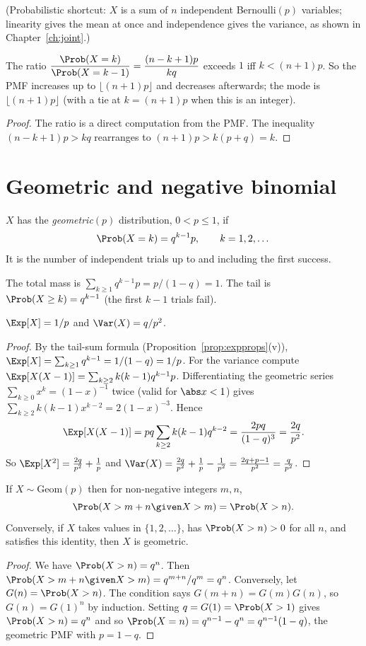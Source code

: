 (Probabilistic shortcut: $X$ is a sum of $n$ independent Bernoulli$(p)$ variables;
linearity gives the mean at once and independence gives the variance, as shown in
Chapter~\ref{ch:joint}.)

\begin{proposition}
The ratio $\dfrac{\Prob(X=k)}{\Prob(X=k-1)}=\dfrac{(n-k+1)p}{kq}$ exceeds $1$ iff
$k<(n+1)p$. So the PMF increases up to $\lfloor(n+1)p\rfloor$ and decreases
afterwards; the mode is $\lfloor(n+1)p\rfloor$ (with a tie at $k=(n+1)p$ when this
is an integer).
\end{proposition}
\begin{proof}
The ratio is a direct computation from the PMF. The inequality
$(n-k+1)p>kq$ rearranges to $(n+1)p>k(p+q)=k$.
\end{proof}

\section{Geometric and negative binomial}

\begin{definition}[Geometric]
$X$ has the \emph{geometric}$(p)$ distribution, $0<p\le1$, if
\[
\Prob(X=k)=q^{k-1}p,\qquad k=1,2,\dots
\]
It is the number of independent trials up to and including the first success.
\end{definition}

The total mass is $\sum_{k\ge1}q^{k-1}p=p/(1-q)=1$. The tail is
$\Prob(X\ge k)=q^{k-1}$ (the first $k-1$ trials fail).

\begin{theorem}\label{thm:geomoments}
$\Exp[X]=1/p$ and $\Var(X)=q/p^2$.
\end{theorem}
\begin{proof}
By the tail-sum formula (Proposition~\ref{prop:expprops}(v)),
$\Exp[X]=\sum_{k\ge1}q^{k-1}=1/(1-q)=1/p$.
For the variance compute $\Exp[X(X-1)]=\sum_{k\ge2}k(k-1)q^{k-1}p$. Differentiating
the geometric series $\sum_{k\ge0}x^k=(1-x)^{-1}$ twice (valid for $\abs x<1$)
gives $\sum_{k\ge2}k(k-1)x^{k-2}=2(1-x)^{-3}$. Hence
\[
\Exp[X(X-1)]=pq\sum_{k\ge2}k(k-1)q^{k-2}=\frac{2pq}{(1-q)^3}=\frac{2q}{p^2}.
\]
So $\Exp[X^2]=\frac{2q}{p^2}+\frac1p$ and
$\Var(X)=\frac{2q}{p^2}+\frac1p-\frac1{p^2}=\frac{2q+p-1}{p^2}=\frac q{p^2}$.
\end{proof}

\begin{theorem}[Memorylessness]\label{thm:memoryless}
If $X\sim\mathrm{Geom}(p)$ then for non-negative integers $m,n$,
\[
\Prob(X>m+n\given X>m)=\Prob(X>n).
\]
Conversely, if $X$ takes values in $\{1,2,\dots\}$, has $\Prob(X>n)>0$ for all $n$,
and satisfies this identity, then $X$ is geometric.
\end{theorem}
\begin{proof}
We have $\Prob(X>n)=q^n$. Then
$\Prob(X>m+n\given X>m)=q^{m+n}/q^m=q^n$.
Conversely, let $G(n)=\Prob(X>n)$. The condition says $G(m+n)=G(m)G(n)$, so
$G(n)=G(1)^n$ by induction. Setting $q=G(1)=\Prob(X>1)$ gives $\Prob(X>n)=q^n$
and so $\Prob(X=n)=q^{n-1}-q^n=q^{n-1}(1-q)$, the geometric PMF with
$p=1-q$.
\end{proof}

